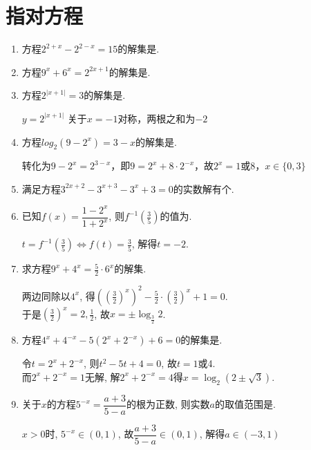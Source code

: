\section{指对方程}
\begin{enumerate}
    \item 方程$2^{2+x}-2^{2-x}=15$的解集是. 
    \item 方程$9^x+6^x=2^{2x+1}$的解集是. 
    \item 方程$2^{\left| {x+1} \right|}=3$的解集是.
    \begin{jieda}
    $y = 2^{\left| {x+1} \right|}$ 关于$x = -1$对称，两根之和为$-2$
    \end{jieda}
    \item 方程$log_2(9-2^x) = 3-x$的解集是.
    \begin{jieda}
        转化为$9-2^x = 2^{3-x}$，即$9 = 2^x + 8 \cdot 2^{-x}$，故$2^x = 1$或$8$，$x \in \{0, 3\}$
    \end{jieda}
    \item 满足方程$3^{2x+2}-3^{x+3}-3^x+3=0$的实数解有个.
    \item 已知$f(x)=\dfrac{1-2^x}{1+2^x}$, 则$f^{-1}(\frac{3}{5})$的值为.
    \begin{jieda}
    $t=f^{-1}(\frac{3}{5})\iff f(t)=\frac{3}{5}$, 解得$t=-2$. 
    \end{jieda}
    \item 求方程$9^x+4^x=\frac{5}{2}\cdot 6^x$的解集. 
    \begin{jieda}
    两边同除以$4^x$, 得$((\frac{3}{2})^x)^2-\frac{5}{2}\cdot(\frac{3}{2})^x+1=0$. \\
    于是$(\frac{3}{2})^x=2,\frac{1}{2}$, 故$x=\pm\log_{\frac{3}{2}}2$. 
    \end{jieda}
    \item 方程$4^x+4^{-x}-5(2^x+2^{-x})+6=0$的解集是.
    \begin{jieda}
    令$t=2^x+2^{-x}$, 则$t^2-5t+4=0$, 故$t=1$或4. \\
    而$2^x+2^{-x}=1$无解, 解$2^x+2^{-x}=4$得$x=\log_2(2\pm\sqrt{3})$. 
    \end{jieda}
    \item 关于$x$的方程$5^{-x}=\dfrac{a+3}{5-a}$的根为正数, 则实数$a$的取值范围是. 
    \begin{jieda}
    $x>0$时, $5^{-x}\in(0,1)$, 故$\dfrac{a+3}{5-a}\in(0,1)$, 解得$a\in(-3,1)$

\end{jieda}
\end{enumerate}
